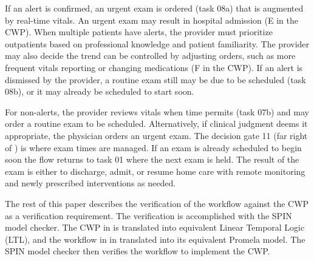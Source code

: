 If an alert is confirmed, an urgent exam is ordered (task 08a) that is augmented by real-time vitals. An urgent exam may result in hospital admission (E in the CWP). When multiple patients have alerts, the provider must prioritize outpatients based on professional knowledge and patient familiarity. The provider may also decide the trend can be controlled by adjusting orders, such as more frequent vitals reporting or changing medications (F in the CWP). If an alert is dismissed by the provider, a routine exam still may be due to be scheduled (task 08b), or it may already be scheduled to start soon. 

For non-alerts, the provider reviews vitals when time permits (task 07b) and may order a routine exam to be scheduled. Alternatively, if clinical judgment deems it appropriate, the physician orders an urgent exam.
The decision gate 11 (far right of ) is where exam times are managed. If an exam is already scheduled to begin soon the flow returns to task 01 where the next exam is held. The result of the exam is either to discharge, admit, or resume home care with remote monitoring and newly prescribed interventions as needed.

The rest of this paper describes the verification of the workflow against the CWP as a verification requirement. The verification is accomplished with the SPIN model checker. The CWP in  is translated into equivalent Linear Temporal Logic (LTL), and the workflow in  in translated into its equivalent Promela model. The SPIN model checker then verifies the workflow to implement the CWP.
